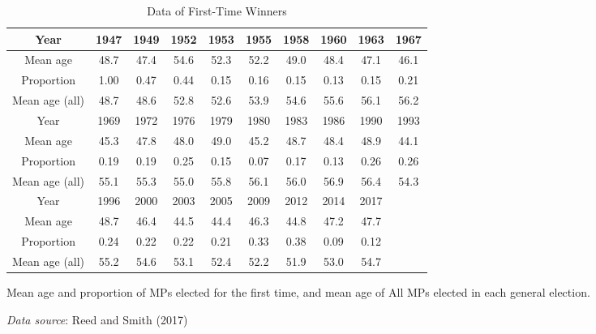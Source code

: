 
\begin{table}[ht]
\begin{threeparttable}
\begin{tabular}{c|ccccccccc}
\toprule
Year & 1947 & 1949 & 1952 & 1953 & 1955 & 1958 & 1960 & 1963 & 1967 \\
\midrule
Mean age & 48.7 & 47.4 & 54.6 & 52.3 & 52.2 & 49.0 & 48.4 & 47.1 & 46.1 \\
Proportion & 1.00 & 0.47 & 0.44 & 0.15 & 0.16 & 0.15 & 0.13 & 0.15 & 0.21 \\
Mean age (all) & 48.7 & 48.6 & 52.8 & 52.6 & 53.9 & 54.6 & 55.6 & 56.1 & 56.2 \\
\midrule 
Year & 1969 & 1972 & 1976 & 1979 & 1980 & 1983 & 1986 & 1990 & 1993 \\
\midrule 
Mean age & 45.3 & 47.8 & 48.0 & 49.0 & 45.2 & 48.7 & 48.4 & 48.9 & 44.1 \\
Proportion & 0.19 & 0.19 & 0.25 & 0.15 & 0.07 & 0.17 & 0.13 & 0.26 & 0.26 \\
Mean age (all) & 55.1 & 55.3 & 55.0 & 55.8 & 56.1 & 56.0 & 56.9 & 56.4 & 54.3 \\
\midrule 
Year & 1996 & 2000 & 2003 & 2005 & 2009 & 2012 & 2014 & 2017 \\
\midrule 
Mean age & 48.7 & 46.4 & 44.5 & 44.4 & 46.3 & 44.8 & 47.2 & 47.7 \\
Proportion & 0.24 & 0.22 & 0.22 & 0.21 & 0.33 & 0.38 & 0.09 & 0.12 \\
Mean age (all) & 55.2 & 54.6 & 53.1 & 52.4 & 52.2 & 51.9 & 53.0 & 54.7 \\
\bottomrule
\end{tabular}
\begin{tablenotes}[flushleft]
  \scriptsize{
    \item Mean age and proportion of MPs elected for the first time, and mean age of All MPs elected in each general election. 
    \item \textit{Data source}: Reed and Smith (2017)
  }
\end{tablenotes}
\end{threeparttable}
\caption{Data of First-Time Winners}
\label{table:firstElection}
\end{table}